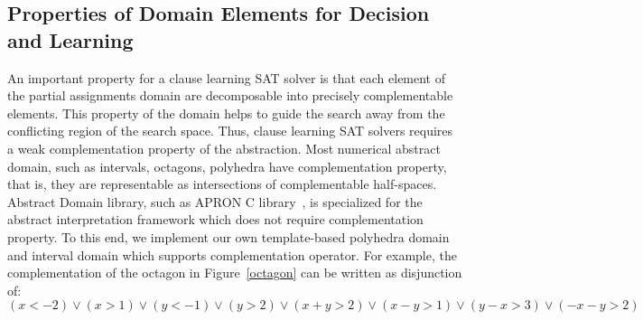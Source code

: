 \subsection{Properties of Domain Elements for Decision and Learning}
%
An important property for a clause learning SAT solver 
is that each element of the partial assignments domain 
are decomposable into precisely complementable 
elements.  This property of the domain helps to 
guide the search away from the conflicting region of the 
search space.  
Thus, clause learning SAT solvers requires a weak complementation property
of the abstraction.  Most numerical abstract domain, such as intervals, 
octagons, polyhedra have complementation property, that is, they are
representable as intersections of complementable half-spaces. 
Abstract Domain library, such as APRON C library~\cite{apron}, 
is specialized for the abstract interpretation framework which 
does not require complementation property.  To this end, we 
implement our own template-based polyhedra domain and interval 
domain which supports complementation operator.  
 For example, the complementation of the octagon in Figure~\ref{octagon} 
can be written as disjunction of:
\[(x<-2) \lor (x>1) \lor (y<-1) \lor (y>2) \lor (x+y>2) \lor (x-y>1) \lor (y-x>3) \lor (-x-y>2)\]
